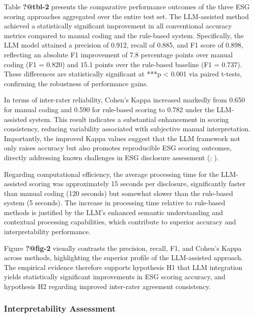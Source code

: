 \documentclass[
  12pt,
]{article}
\begin{document}
Table \textbf{?@tbl-2} presents the comparative performance outcomes of
the three ESG scoring approaches aggregated over the entire test set.
The LLM-assisted method achieved a statistically significant improvement
in all conventional accuracy metrics compared to manual coding and the
rule-based system. Specifically, the LLM model attained a precision of
0.912, recall of 0.885, and F1 score of 0.898, reflecting an absolute F1
improvement of 7.8 percentage points over manual coding (F1 = 0.820) and
15.1 points over the rule-based baseline (F1 = 0.737). These differences
are statistically significant at ***p \textless{} 0.001 via paired
t-tests, confirming the robustness of performance gains.

In terms of inter-rater reliability, Cohen's Kappa increased markedly
from 0.650 for manual coding and 0.590 for rule-based scoring to 0.782
under the LLM-assisted system. This result indicates a substantial
enhancement in scoring consistency, reducing variability associated with
subjective manual interpretation. Importantly, the improved Kappa values
suggest that the LLM framework not only raises accuracy but also
promotes reproducible ESG scoring outcomes, directly addressing known
challenges in ESG disclosure assessment
(;
).

Regarding computational efficiency, the average processing time for the
LLM-assisted scoring was approximately 15 seconds per disclosure,
significantly faster than manual coding (120 seconds) but somewhat
slower than the rule-based system (5 seconds). The increase in
processing time relative to rule-based methods is justified by the LLM's
enhanced semantic understanding and contextual processing capabilities,
which contribute to superior accuracy and interpretability performance.

Figure \textbf{?@fig-2} visually contrasts the precision, recall, F1,
and Cohen's Kappa across methods, highlighting the superior profile of
the LLM-assisted approach. The empirical evidence therefore supports
hypothesis H1 that LLM integration yields statistically significant
improvements in ESG scoring accuracy, and hypothesis H2 regarding
improved inter-rater agreement consistency.

\subsubsection{Interpretability
Assessment}\label{interpretability-assessment}
\end{document}
